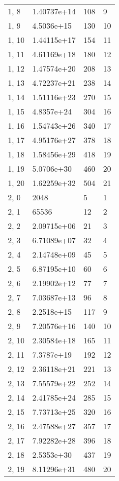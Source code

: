 \begin{table}
\begin{tabular}{llll}
1, 8   &  1.40737e+14 &  108 &     9 \\
1, 9   &   4.5036e+15 &  130 &    10 \\
1, 10  &  1.44115e+17 &  154 &    11 \\
1, 11  &  4.61169e+18 &  180 &    12 \\
1, 12  &  1.47574e+20 &  208 &    13 \\
1, 13  &  4.72237e+21 &  238 &    14 \\
1, 14  &  1.51116e+23 &  270 &    15 \\
1, 15  &   4.8357e+24 &  304 &    16 \\
1, 16  &  1.54743e+26 &  340 &    17 \\
1, 17  &  4.95176e+27 &  378 &    18 \\
1, 18  &  1.58456e+29 &  418 &    19 \\
1, 19  &   5.0706e+30 &  460 &    20 \\
1, 20  &  1.62259e+32 &  504 &    21 \\
2, 0   &         2048 &    5 &     1 \\
2, 1   &        65536 &   12 &     2 \\
2, 2   &  2.09715e+06 &   21 &     3 \\
2, 3   &  6.71089e+07 &   32 &     4 \\
2, 4   &  2.14748e+09 &   45 &     5 \\
2, 5   &  6.87195e+10 &   60 &     6 \\
2, 6   &  2.19902e+12 &   77 &     7 \\
2, 7   &  7.03687e+13 &   96 &     8 \\
2, 8   &   2.2518e+15 &  117 &     9 \\
2, 9   &  7.20576e+16 &  140 &    10 \\
2, 10  &  2.30584e+18 &  165 &    11 \\
2, 11  &   7.3787e+19 &  192 &    12 \\
2, 12  &  2.36118e+21 &  221 &    13 \\
2, 13  &  7.55579e+22 &  252 &    14 \\
2, 14  &  2.41785e+24 &  285 &    15 \\
2, 15  &  7.73713e+25 &  320 &    16 \\
2, 16  &  2.47588e+27 &  357 &    17 \\
2, 17  &  7.92282e+28 &  396 &    18 \\
2, 18  &   2.5353e+30 &  437 &    19 \\
2, 19  &  8.11296e+31 &  480 &    20 \\

\end{tabular}
\end{table}
